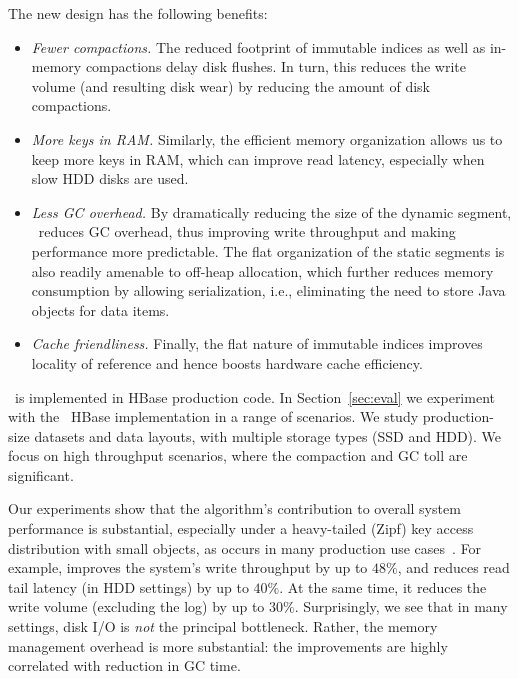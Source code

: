 The new design has the following benefits:
\begin{itemize} 
 \item \emph{Fewer compactions.}
The reduced footprint of immutable indices as well as in-memory compactions delay disk flushes. In turn, this reduces the write volume (and resulting disk wear) by reducing the amount of disk compactions.
\item \emph{More keys in RAM.} Similarly, the efficient memory organization allows us to keep more keys 
in RAM, which can improve read latency, especially when slow HDD disks are used.
\item \emph{Less GC overhead.}  By dramatically reducing the size of the dynamic segment, \sys\ reduces GC overhead, thus improving write throughput and making performance more predictable.
The flat organization of the static segments 
is also readily amenable to off-heap allocation, which further reduces memory consumption
 by allowing serialization, i.e., eliminating the need to store Java objects for data items. 
\item \emph{Cache friendliness.} Finally, the flat nature of immutable indices improves locality of reference and hence boosts hardware cache efficiency. 
\end{itemize}
 
\sys\ is implemented in HBase production code. In Section~\ref{sec:eval} we experiment with the \sys\ HBase implementation in a range of scenarios.
We study production-size datasets and data layouts, with multiple storage types (SSD and HDD). 
We focus on high throughput scenarios, where the compaction and GC toll are significant. 

Our experiments show that the algorithm's contribution to overall system performance is substantial, 
especially under a  heavy-tailed (Zipf) key access distribution with 
small objects, as occurs in many production use cases~\cite{Wu2015}. For example, \sys\/ 
improves the system's write throughput by up to $48\%$, and reduces read tail latency 
(in HDD settings)  
by up to $40\%$. At the same time, it reduces the write volume (excluding the log) by up to $30\%$. Surprisingly, we see 
that in many settings, disk I/O is \emph{not} the principal bottleneck. Rather, the memory management 
overhead is more substantial: the improvements are highly correlated with  reduction in GC time. 

